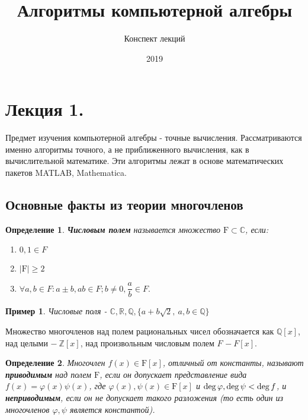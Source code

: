 \documentclass[12pt]{article}
\begin{document}
\renewcommand{\contentsname}{Содержание}
\title{Алгоритмы компьютерной алгебры}
\author{Конспект лекций}
\date{2019}
\maketitle
\newpage

\tableofcontents
\newpage

\theoremstyle{plain}
\newtheorem{thm}{Теорема}
\newtheorem*{rev*}{Обратное утверждение}
\newtheorem{defn}{Определение}
\newtheorem{examp}{Пример}
\newtheorem{lem}{Лемма}
\newtheorem{sled}{Следствие}
\newtheorem*{sl*}{Следствие}

\def\MYdeg{\mathop{\rm deg}\limits}

\section{Лекция 1.}
\hspace{0.5cm}Предмет изучения компьютерной алгебры - точные вычисления. Рассматриваются именно алгоритмы точного, а не приближенного вычисления, как в вычислительной математике. Эти алгоритмы лежат в основе математических пакетов MATLAB, Mathematica.

\subsection{Основные факты из теории многочленов}
\begin{defn}
\textbf{Числовым полем} называется множество $\mathrm{F} \subset \mathbb{C}$, если:
\begin{enumerate}
\item $0, 1 \in F$
\item $\mathrm{|F| \ge 2}$
\item $\forall a,b \in F: a \pm b, ab \in F; b \ne 0, \dfrac{a}{b} \in F.$
\end{enumerate}
\end{defn}

\begin{examp}
Числовые поля - $\mathbb{C}, \mathbb{R}, \mathbb{Q}, \{a + b\sqrt{2},~a,b \in \mathbb{Q}\}$
\end{examp}
Множество многочленов над полем рациональных чисел обозначается как $\mathbb{Q}[x]$, над целыми $-~\mathbb{Z}[x]$,
над произвольным числовым полем $F$ $-~F[x].$

\begin{defn}
Многочлен $f(x) \in \mathrm{F}[x]$, отличный от константы, называют \textbf{ приводимым} над полем $\mathrm{F}$, если он допускает представление вида $f(x) = \varphi(x) \psi(x)$, где $\varphi(x), \psi(x) \in \mathrm{F}[x]$ и $\MYdeg \varphi, \MYdeg \psi < \MYdeg f$, и \textbf{ неприводимым}, если он не допускает такого разложения (то есть один из многочленов $\varphi, \psi$ является константой).
\end{defn}
\end{document}
